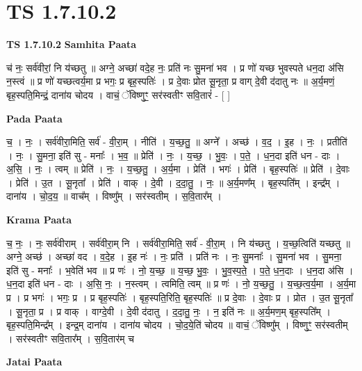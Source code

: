 \documentclass[17pt]{extarticle}
\begin{document}
\section*{ TS 1.7.10.2 }

\textbf{TS 1.7.10.2 } \newline
\textbf{Samhita Paata} \newline

च॑ नः॒ सर्व॑वीरां॒ नि य॑च्छतु ॥ अग्ने॒ अच्छा॑ वदे॒ह नः॒ प्रति॑ नः सु॒मना॑ भव । प्र णो॑ यच्छ भुवस्पते धन॒दा अ॑सि न॒स्त्वं ॥ प्र णो॑ यच्छत्वर्य॒मा प्र भगः॒ प्र बृह॒स्पतिः॑ । प्र दे॒वाः प्रोत सू॒नृता॒ प्र वाग् दे॒वी द॑दातु नः ॥ अ॒र्य॒मणं॒ बृह॒स्पति॒मिन्द्रं॒ दाना॑य चोदय । वाचं॒ ॅविष्णुꣳ॒॒ सर॑स्वतीꣳ सवि॒तारं॑ - [ ] \newline

\textbf{Pada Paata} \newline

च॒ । नः॒ । सर्व॑वीरा॒मिति॒ सर्व॑ - वी॒रा॒म् । नीति॑ । य॒च्छ॒तु॒ ॥ अग्ने᳚ । अच्छ॑ । व॒द॒ । इ॒ह । नः॒ । प्रतीति॑ । नः॒ । सु॒मना॒ इति॑ सु - मनाः᳚ । भ॒व॒ ॥ प्रेति॑ । नः॒ । य॒च्छ॒ । भु॒वः॒ । प॒ते॒ । ध॒न॒दा इति॑ धन - दाः । अ॒सि॒ । नः॒ । त्वम् ॥ प्रेति॑ । नः॒ । य॒च्छ॒तु॒ । अ॒र्य॒मा । प्रेति॑ । भगः॑ । प्रेति॑ । बृह॒स्पतिः॑ ॥ प्रेति॑ । दे॒वाः । प्रेति॑ । उ॒त । सू॒नृता᳚ । प्रेति॑ । वाक् । दे॒वी । द॒दा॒तु॒ । नः॒ ॥ अ॒र्य॒मण᳚म् । बृह॒स्पति᳚म् । इन्द्र᳚म् । दाना॑य । चो॒द॒य॒ ॥ वाच᳚म् । विष्णु᳚म् । सर॑स्वतीम् । स॒वि॒तार᳚म् ।  \newline


\textbf{Krama Paata} \newline

च॒ नः॒ । नः॒ सर्व॑वीराम् । सर्व॑वीरा॒म् नि । सर्व॑वीरा॒मिति॒ सर्व॑ - वी॒रा॒म् । नि य॑च्छतु । य॒च्छ॒त्विति॑ यच्छतु ॥ अग्ने॒ अच्छ॑ । अच्छा॑ वद । व॒दे॒ह । इ॒ह नः॑ । नः॒ प्रति॑ । प्रति॑ नः । नः॒ सु॒मनाः᳚ । सु॒मना॑ भव । सु॒मना॒ इति॑ सु - मनाः᳚ । भ॒वेति॑ भव ॥ प्र णः॑ । नो॒ य॒च्छ॒ ॥ य॒च्छ॒ भु॒वः॒ । भु॒व॒स्प॒ते॒ । प॒ते॒ ध॒न॒दाः । ध॒न॒दा अ॑सि । ध॒न॒दा इति॑ धन - दाः । अ॒सि॒ नः॒ । न॒स्त्वम् । त्वमिति॒ त्वम् ॥ प्र णः॑ । नो॒ य॒च्छ॒तु॒ । य॒च्छ॒त्व॒र्य॒मा । अ॒र्य॒मा प्र । प्र भगः॑ । भगः॒ प्र । प्र बृह॒स्पतिः॑ । बृह॒स्पति॒रिति॒ बृह॒स्पतिः॑ ॥ प्र दे॒वाः । दे॒वाः प्र । प्रोत । उ॒त सू॒नृता᳚ । सू॒नृता॒ प्र । प्र वाक् । वाग्दे॒वी । दे॒वी द॑दातु । द॒दा॒तु॒ नः॒ । न॒ इति॑ नः ॥ अ॒र्य॒मण॒म् बृह॒स्पति᳚म् । बृह॒स्पति॒मिन्द्र᳚म् । इन्द्र॒म् दाना॑य । दाना॑य चोदय । चो॒द॒ये॒ति॑ चोदय ॥ वाचं॒ ॅविष्णु᳚म् । विष्णुꣳ॒॒ सर॑स्वतीम् । सर॑स्वतीꣳ सवि॒तार᳚म् । स॒वि॒तार॑म् च \newline

\textbf{Jatai Paata} \newline
\end{document}
